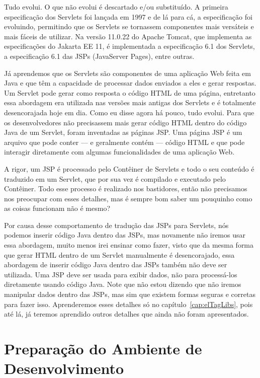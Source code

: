 Tudo evolui. O que não evolui é descartado e/ou substituído. A primeira especificação dos Servlets foi lançada em 1997 e de lá para cá, a especificação foi evoluindo, permitindo que os Servlets se tornassem componentes mais versáteis e mais fáceis de utilizar. Na versão 11.0.22 do Apache Tomcat, que implementa as especificações do Jakarta EE 11, é implementada a especificação 6.1 dos Servlets, a especificação 6.1 das JSPs (JavaServer Pages), entre outras.

Já aprendemos que os Servlets são componentes de uma aplicação Web feita em Java e que têm a capacidade de processar dados enviados a eles e gerar respostas. Um Servlet pode gerar como resposta o código HTML de uma página, entretanto essa abordagem era utilizada nas versões mais antigas dos Servlets e é totalmente desencorajada hoje em dia. Como eu disse agora há pouco, tudo evolui. Para que os desenvolvedores não precisassem mais gerar código HTML dentro do código Java de um Servlet, foram inventadas as páginas JSP. Uma página JSP é um arquivo que pode conter --- e geralmente contém --- código HTML e que pode interagir diretamente com algumas funcionalidades de uma aplicação Web.

A rigor, um JSP é processado pelo Contêiner de Servlets e todo o seu conteúdo é traduzido em um Servlet, que por sua vez é compilado e executado pelo Contêiner. Todo esse processo é realizado nos bastidores, então não precisamos nos preocupar com esses detalhes, mas é sempre bom saber um pouquinho como as coisas funcionam não é mesmo?

Por causa desse comportamento de tradução das JSPs para Servlets, nós podemos inserir código Java dentro das JSPs, mas novamente não iremos usar essa abordagem, muito menos irei ensinar como fazer, visto que da mesma forma que gerar HTML dentro de um Servlet manualmente é desencorajado, essa abordagem de inserir código Java dentro das JSPs também não deve ser utilizada. Uma JSP deve ser usada para exibir dados, não para processá-los diretamente usando código Java. Note que não estou dizendo que não iremos manipular dados dentro das JSPs, mas sim que existem formas seguras e corretas para fazer isso. Aprenderemos esses detalhes só no capítulo~\ref{cap:elTagLibs}, pois até lá, já teremos aprendido outros detalhes que ainda não foram apresentados.


\section{Preparação do Ambiente de Desenvolvimento}

